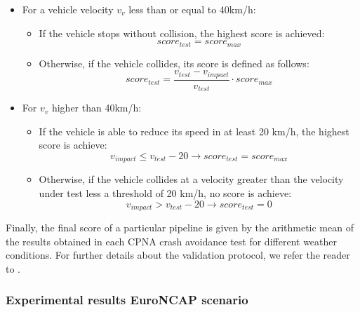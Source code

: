 \begin{itemize}
	\item For a vehicle velocity \(v_v\) less than or equal to 40km/h:
	\begin{itemize}
		\item If the vehicle stops without collision, the highest score is achieved:
		\begin{equation}
			score_{test} = score_{max}
			\label{eq1}
		\end{equation}
		
		\item Otherwise, if the vehicle collides, its score is defined as follows:
		\begin{equation}
			score_{test} = \frac{v_{test}-v_{impact}}{v_{test}} \cdot score_{max}
			\label{eq2}
		\end{equation}
	\end{itemize}
	\item For \(v_v\) higher than 40km/h:
	\begin{itemize}
		\item If the vehicle is able to reduce its speed in at least 20 km/h, the highest score is achieve:
		\begin{equation}
			v_{impact} \leq v_{test} - 20 \to score_{test} = score_{max}
			\label{eq3}
		\end{equation}
		\item Otherwise, if the vehicle collides at a velocity greater than the velocity under test less a threshold of 20 km/h, no score is achieve:
		\begin{equation}
			v_{impact} > v_{test} - 20 \to score_{test} = 0
			\label{eq4}
		\end{equation}
	\end{itemize}
\end{itemize}

Finally, the final score of a particular pipeline is given by the arithmetic mean of the results obtained in each CPNA crash avoidance test for different weather conditions. For further details about the validation protocol, we refer the reader to \cite{gutierrez2021validation}.

\subsubsection{Experimental results EuroNCAP scenario}
\label{sec:5_euroncap_experimental_results}

